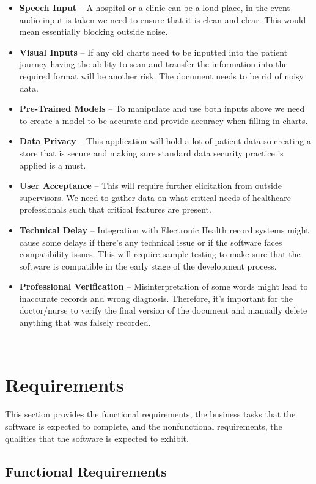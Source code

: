 \documentclass[12pt]{article}
\begin{document}
\begin{itemize}
  \item \textbf{Speech Input} -- A hospital or a clinic can be a loud place, in the event audio input is taken we need to ensure that it is clean and clear. This would mean essentially blocking outside noise. 
  \item \textbf{Visual Inputs} -- If any old charts need to be inputted into the patient journey having the ability to scan and transfer the information into the required format will be another risk. The document needs to be rid of noisy data.
  \item \textbf{Pre-Trained Models} -- To manipulate and use both inputs above we need to create a model to be accurate and provide accuracy when filling in charts. 
  \item \textbf{Data Privacy} -- This application will hold a lot of patient data so creating a store that is secure and making sure standard data security practice is applied is a must.
  \item \textbf{User Acceptance} -- This will require further elicitation from outside supervisors. We need to gather data on what critical needs of healthcare professionals such that critical features are present.
  \item \textbf{Technical Delay} – Integration with Electronic Health record systems might cause some delays if there’s any technical issue or if the software faces compatibility issues. This will require sample testing to make sure that the software is compatible in the early stage of the development process.
  \item \textbf{Professional Verification} – Misinterpretation of some words might lead to inaccurate records and wrong diagnosis. Therefore, it’s important for the doctor/nurse to verify the final version of the document and manually delete anything that was falsely recorded. 
\end{itemize}

~\newpage

\section{Requirements}

This section provides the functional requirements, the business tasks that the
software is expected to complete, and the nonfunctional requirements, the
qualities that the software is expected to exhibit.

\subsection{Functional Requirements}
\end{document}
